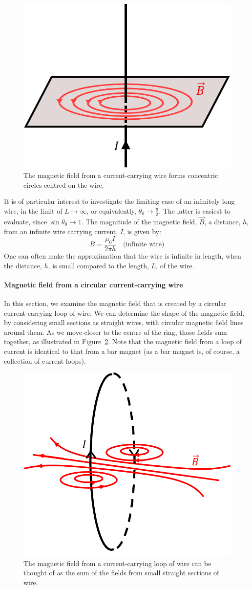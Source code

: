 \begin{figure}[!htbp]
\centering
\includegraphics[width=0.4\linewidth]{files/wirefield-f0efa665a11f2b4ea619f8be5412e4f8.png}
\caption[]{The magnetic field from a current-carrying wire forms concentric circles centred on the wire.}
\label{fig:magneticsource:wirefield}
\end{figure}

It is of particular interest to investigate the limiting case of an infinitely long wire, in the limit of $L\to\infty$, or equivalently, $\theta_0\to\frac{\pi}{2}$. The latter is easiest to evaluate, since $\sin\theta_0\to 1$. The magnitude of the magnetic field, $\vec B$, a distance, $h$, from an infinite wire carrying current, $I$, is given by:
\begin{equation}
\boxed{ B = \frac{\mu_0 I}{2\pi h}}\quad\text{(infinite wire)}
\end{equation}
One can often make the approximation that the wire is infinite in length, when the distance, $h$, is small compared to the length, $L$, of the wire.

\paragraph{Magnetic field from a circular current-carrying wire}

In this section, we examine the magnetic field that is created by a circular current-carrying loop of wire. We can determine the shape of the magnetic field, by considering small sections as straight wires, with circular magnetic field lines around them. As we move closer to the centre of the ring, those fields sum together, as illustrated in Figure~\ref{fig:magneticsource:ringfield}. Note that the magnetic field from a loop of current is identical to that from a bar magnet (as a bar magnet is, of course, a collection of current loops).

\begin{figure}[!htbp]
\centering
\includegraphics[width=0.4\linewidth]{files/ringfield-f13bccba775229de52496b9398a5ad25.png}
\caption[]{The magnetic field from a current-carrying loop of wire can be thought of as the sum of the fields from small straight sections of wire.}
\label{fig:magneticsource:ringfield}
\end{figure}

